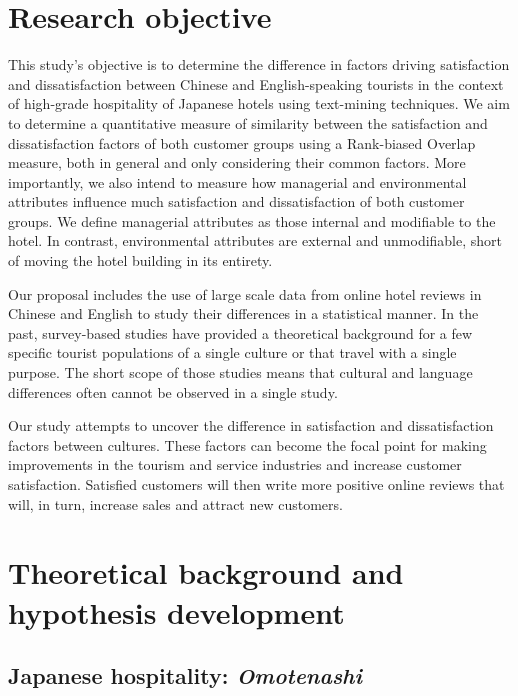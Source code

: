 \documentclass[smallextended,natbib]{svjour3}       %
\begin{document}
\section{Research objective}\label{research_objective}

This study's objective is to determine the difference in factors driving satisfaction and dissatisfaction between Chinese and English-speaking tourists in the context of high-grade hospitality of Japanese hotels using text-mining techniques. We aim to determine a quantitative measure of similarity between the satisfaction and dissatisfaction factors of both customer groups using a Rank-biased Overlap measure, both in general and only considering their common factors. More importantly, we also intend to measure how managerial and environmental attributes influence much satisfaction and dissatisfaction of both customer groups. We define managerial attributes as those internal and modifiable to the hotel. In contrast, environmental attributes are external and unmodifiable, short of moving the hotel building in its entirety.

Our proposal includes the use of large scale data from online hotel reviews in Chinese and English to study their differences in a statistical manner. In the past, survey-based studies have provided a theoretical background for a few specific tourist populations of a single culture or that travel with a single purpose. The short scope of those studies means that cultural and language differences often cannot be observed in a single study. 

Our study attempts to uncover the difference in satisfaction and dissatisfaction factors between cultures. These factors can become the focal point for making improvements in the tourism and service industries and increase customer satisfaction. Satisfied customers will then write more positive online reviews that will, in turn, increase sales and attract new customers. 

\section{Theoretical background and hypothesis development}\label{theory_hypothesis}

\subsection{Japanese hospitality: \textit{Omotenashi}}\label{theory_omotenashi}
\end{document}
